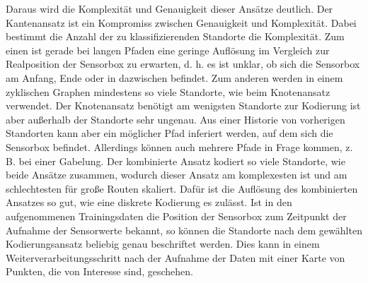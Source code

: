 \newline
\newline
Daraus wird die Komplexität und Genauigkeit dieser Ansätze deutlich.
Der Kantenansatz ist ein Kompromiss zwischen Genauigkeit und Komplexität.
Dabei bestimmt die Anzahl der zu klassifizierenden Standorte die Komplexität.
Zum einen ist gerade bei langen Pfaden eine geringe Auflösung im Vergleich zur Realposition der Sensorbox zu erwarten,
d. h. es ist unklar, ob sich die Sensorbox am Anfang, Ende oder in dazwischen befindet.
Zum anderen werden in einem zyklischen Graphen mindestens so viele Standorte, wie beim Knotenansatz verwendet.
Der Knotenansatz benötigt am wenigsten Standorte zur Kodierung ist aber außerhalb der Standorte sehr ungenau.
\newpage
Aus einer Historie von vorherigen Standorten kann aber ein möglicher Pfad inferiert werden, auf dem sich die Sensorbox befindet.
Allerdings können auch mehrere Pfade in Frage kommen, z. B. bei einer Gabelung.
Der kombinierte Ansatz kodiert so viele Standorte, wie beide Ansätze zusammen,
wodurch dieser Ansatz am komplexesten ist und am schlechtesten für große Routen skaliert.
Dafür ist die Auflösung des kombinierten Ansatzes so gut, wie eine diskrete Kodierung es zulässt.
\newline
\newline
Ist in den aufgenommenen Trainingsdaten die Position der Sensorbox zum Zeitpunkt der Aufnahme der Sensorwerte bekannt,
so können die Standorte nach dem gewählten Kodierungsansatz beliebig genau beschriftet werden.
Dies kann in einem Weiterverarbeitungsschritt nach der Aufnahme der Daten mit einer Karte von Punkten, die von Interesse sind, geschehen.